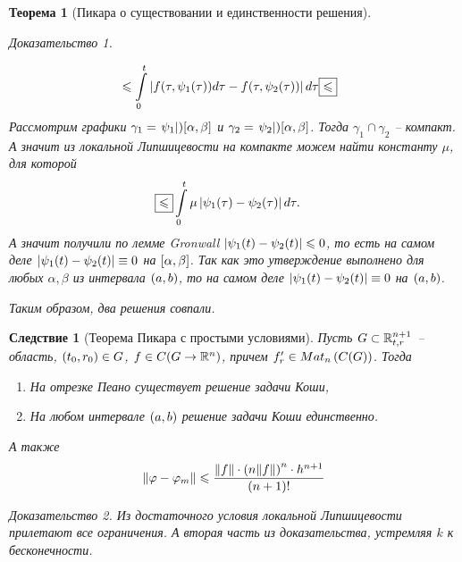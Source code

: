 \documentclass[a5paper, 10pt]{article}
\theoremstyle{definition}
\theoremstyle{plain}
\newtheorem{Th}{Теорема}
\newtheorem{Cor}{Следствие}
\theoremstyle{remark}
\newtheorem*{Proof}{Доказательство}
\begin{document}
\begin{Th}[Пикара о существовании и единственности решения]
\begin{Proof}
\begin{enumerate}
\[\begin{split}
			&\leqslant \int\limits_0^t \left|f(\tau, \psi_1(\tau))d\tau - f(\tau, \psi_2(\tau))\right|d\tau \boxed{\leqslant}
			\end{split}
			\]
			Рассмотрим графики $\gamma_1 = \left.\psi_1\right|){\left[\alpha, \beta\right]}$ и $\gamma_2 = \left.\psi_2\right|){\left[\alpha, \beta\right]}$. Тогда $\gamma_1 \cap \gamma_2$ -- компакт. А значит из локальной Липшицевости на компакте можем найти константу $\mu$, для которой
			\[
			\begin{split}
				&\boxed{\leqslant} \int\limits_0^t \mu \left|\psi_1(\tau) - \psi_2(\tau)\right|d\tau.
			\end{split}
			\]
			А значит получили по лемме Gronwall $\left|\psi_1(t) - \psi_2(t)\right| \leqslant 0$, то есть на самом деле $\left|\psi_1(t) - \psi_2(t)\right| \equiv 0$ на $\left[\alpha, \beta\right]$. Так как это утверждение выполнено для любых $\alpha, \beta$ из интервала $\left(a,b\right)$, то на самом деле  $\left|\psi_1(t) - \psi_2(t)\right| \equiv 0$ на $\left(a, b\right)$. 
			
			Таким образом, два решения совпали.
		\end{enumerate}
	\end{Proof}
	\end{Th}
	\begin{Cor}[Теорема Пикара с простыми условиями]
		Пусть $G \subset \mathbb{R}^{n+1}_{t,r}$ -- область, $\left(t_0, r_0\right) \in G$, $f \in C(G \rightarrow \mathbb{R}^n)$, причем $f'_r \in Mat_n\left(C(G)\right)$.
		Тогда \begin{enumerate}
			\item На отрезке Пеано существует решение задачи Коши,
			\item На любом интервале $\left(a,b\right)$ решение задачи Коши единственно.
		\end{enumerate}
		
		А также \[
		\|\varphi-\varphi_m\| \leqslant \frac{\|f\| \cdot \left(n\|f\|\right)^n \cdot h^{n+1}}{\left(n+1\right)!}
		\]
		\begin{Proof}
			Из достаточного условия локальной Липшицевости прилетают все ограничения.
			А вторая часть из доказательства, устремляя $k$ к бесконечности.
		\end{Proof}
	\end{Cor}
	
\end{document}
